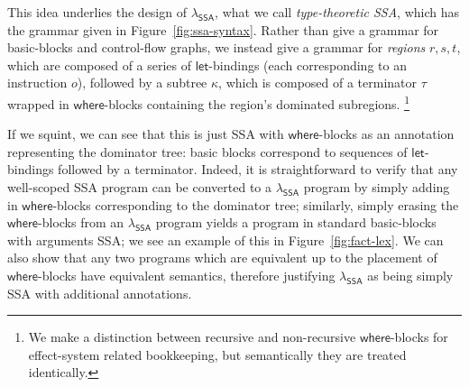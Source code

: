 \documentclass[acmsmall,screen,review]{acmart}
\newcommand{\ms}[1]{\ensuremath{\mathsf{#1}}}
\newcommand{\isotopessa}{\(\lambda_{\ms{SSA}}\)}
\begin{document}
This idea underlies the design of \isotopessa{}, what we call \emph{type-theoretic SSA}, which has
the grammar given in Figure~\ref{fig:ssa-syntax}. Rather than give a grammar for basic-blocks and
control-flow graphs, we instead give a grammar for \emph{regions} $r, s, t$, which are composed of a
series of \ms{let}-bindings (each corresponding to an instruction $o$), followed by a subtree
$\kappa$, which is composed of a terminator $\tau$ wrapped in \ms{where}-blocks containing the
region's dominated subregions. \footnote{We make a distinction between recursive and non-recursive
\ms{where}-blocks for effect-system related bookkeeping, but semantically they are treated
identically.}

If we squint, we can see that this is just SSA with \ms{where}-blocks as an annotation representing
the dominator tree: basic blocks correspond to sequences of \ms{let}-bindings followed by a
terminator. Indeed, it is straightforward to verify that any well-scoped SSA program can be
converted to a \isotopessa{} program by simply adding in \ms{where}-blocks corresponding to the
dominator tree; similarly, simply erasing the \ms{where}-blocks from an \isotopessa{} program yields
a program in standard basic-blocks with arguments SSA; we see an example of this in
Figure~\ref{fig:fact-lex}. We can also show that any two programs which are equivalent up to the
placement of \ms{where}-blocks have equivalent semantics, therefore justifying \isotopessa{} as
being simply SSA with additional annotations.
\end{document}
